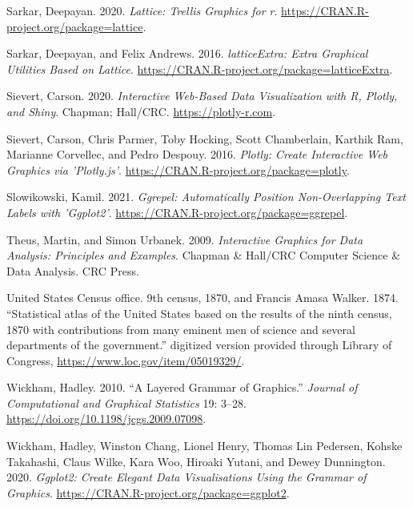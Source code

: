 \begin{CSLReferences}{1}{0}
\leavevmode{}%
Sarkar, Deepayan. 2020. \emph{Lattice: Trellis Graphics for r}. \url{https://CRAN.R-project.org/package=lattice}.

\leavevmode{}%
Sarkar, Deepayan, and Felix Andrews. 2016. \emph{{latticeExtra: Extra Graphical Utilities Based on Lattice}}. \url{https://CRAN.R-project.org/package=latticeExtra}.

\leavevmode{}%
Sievert, Carson. 2020. \emph{Interactive Web-Based Data Visualization with {R}, Plotly, and Shiny}. Chapman; Hall/CRC. \url{https://plotly-r.com}.

\leavevmode{}%
Sievert, Carson, Chris Parmer, Toby Hocking, Scott Chamberlain, Karthik Ram, Marianne Corvellec, and Pedro Despouy. 2016. \emph{Plotly: Create Interactive Web Graphics via 'Plotly.js'}. \url{https://CRAN.R-project.org/package=plotly}.

\leavevmode{}%
Slowikowski, Kamil. 2021. \emph{Ggrepel: Automatically Position Non-Overlapping Text Labels with 'Ggplot2'}. \url{https://CRAN.R-project.org/package=ggrepel}.

\leavevmode{}%
Theus, Martin, and Simon Urbanek. 2009. \emph{Interactive Graphics for Data Analysis: Principles and Examples}. Chapman \& Hall/CRC Computer Science \& Data Analysis. CRC Press.

\leavevmode{}%
United States Census office. 9th census, 1870, and Francis Amasa Walker. 1874. {``{Statistical atlas of the United States based on the results of the ninth census, 1870 with contributions from many eminent men of science and several departments of the government}.''} digitized version provided through Library of Congress, \url{https://www.loc.gov/item/05019329/}.

\leavevmode{}%
Wickham, Hadley. 2010. {``A Layered Grammar of Graphics.''} \emph{Journal of Computational and Graphical Statistics} 19: 3--28. \url{https://doi.org/10.1198/jcgs.2009.07098}.

\leavevmode{}%
Wickham, Hadley, Winston Chang, Lionel Henry, Thomas Lin Pedersen, Kohske Takahashi, Claus Wilke, Kara Woo, Hiroaki Yutani, and Dewey Dunnington. 2020. \emph{Ggplot2: Create Elegant Data Visualisations Using the Grammar of Graphics}. \url{https://CRAN.R-project.org/package=ggplot2}.


\end{CSLReferences}
